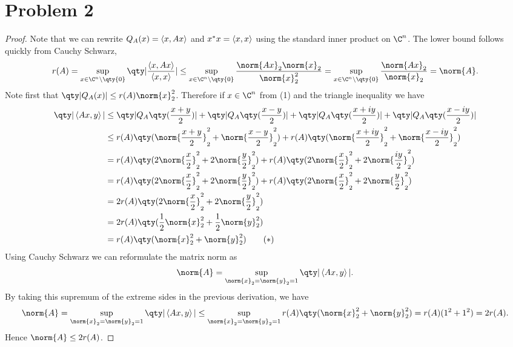 \documentclass{article}
\begin{document}
\section*{Problem 2}
\begin{proof}
    Note that we can rewrite $Q_A(x) = \iprd{x, Ax}$ and $x^* x = \iprd{x, x}$ using the standard inner product on $\C^n$. The lower bound follows quickly from Cauchy Schwarz,
    \[
        r(A) = \sup_{x \in \C^n \setminus \qty{0}} \qty|\frac{\iprd{x, Ax}}{\iprd{x,x}}| \leq \sup_{x\in \C^n \setminus \qty{0}} \frac{\norm{Ax}_2 \norm{x}_2}{\norm{x}_2^2} = \sup_{x \in \C^n \setminus \qty{0}} \frac{\norm{Ax}_2}{\norm{x}_2} = \norm{A}
    .\]
    Note first that $\qty|Q_A(x)| \leq r(A) \norm{x}_2^2$. Therefore if $x \in \C^n$ from (1) and the triangle inequality we have
    \begin{align*}
        \qty|\iprd{Ax,y}| &\leq \qty|Q_A\qty(\frac{x+y}{2})| + \qty|Q_A\qty(\frac{x-y}{2})| + \qty|Q_A\qty(\frac{x+iy}{2})| + \qty|Q_A\qty(\frac{x-iy}{2})| \\
        &\leq r(A) \qty(\norm{\frac{x+y}{2}}_2^2 + \norm{\frac{x-y}{2}}_2^2) + r(A) \qty(\norm{\frac{x+iy}{2}}_2^2 + \norm{\frac{x-iy}{2}}_2^2) \\
        &= r(A) \qty(2\norm{\frac{x}{2}}_2^2 + 2\norm{\frac{y}{2}}_2^2) + r(A) \qty(2\norm{\frac{x}{2}}_2^2 + 2\norm{\frac{iy}{2}}_2^2) \\
        &= r(A) \qty(2\norm{\frac{x}{2}}_2^2 + 2\norm{\frac{y}{2}}_2^2) + r(A) \qty(2\norm{\frac{x}{2}}_2^2 + 2\norm{\frac{y}{2}}_2^2) \\
        &= 2r(A) \qty(2\norm{\frac{x}{2}}_2^2 + 2\norm{\frac{y}{2}}_2^2) \\
        &= 2r(A) \qty(\frac{1}{2}\norm{x}_2^2 + \frac{1}{2}\norm{y}_2^2) \\
    &= r(A) \qty(\norm{x}_2^2 + \norm{y}_2^2) \tag{$*$}
    \end{align*}
    Using Cauchy Schwarz we can reformulate the matrix norm as
    \[
        \norm{A} = \sup_{\norm{x}_2 = \norm{y}_2 = 1} \qty|\iprd{Ax, y}|
    .\]
    By taking this supremum of the extreme sides in the previous derivation, we have
    \[
        \norm{A} = \sup_{\norm{x}_2 = \norm{y}_2 = 1} \qty|\iprd{Ax, y}| \leq \sup_{\norm{x}_2 = \norm{y}_2 = 1} r(A) \qty(\norm{x}_2^2 + \norm{y}_2^2) = r(A) (1^2 + 1^2) = 2r(A)
.\]
    Hence $\norm{A} \leq 2r(A)$.
\end{proof}
\end{document}
